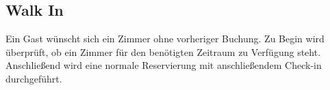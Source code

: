 \documentclass[../SubfileFeatures.tex]{subfiles}
\begin{document}
    \subsection{Walk In}
	Ein Gast wünscht sich ein Zimmer ohne vorheriger Buchung.
	Zu Begin wird überprüft, ob ein Zimmer für den benötigten Zeitraum zu Verfügung steht.
	Anschließend wird eine normale Reservierung mit anschließendem Check-in durchgeführt.
\end{document}
